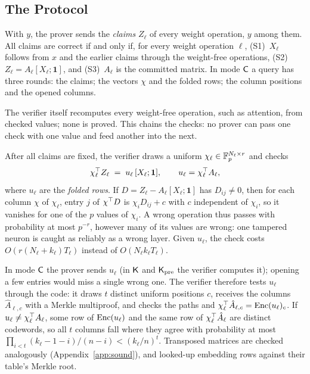 \subsection{The Protocol}
\label{sec:protocol}

With $y$, the prover sends the \emph{claims} $Z_\ell$ of every weight operation, $y$ among them. All
claims are correct if and only if, for every weight operation $\ell$, (S1)~$X_\ell$ follows from $x$
and the earlier claims through the weight-free operations,
(S2)~$Z_\ell=A_\ell[X_\ell;\mathbf 1]$, and (S3)~$A_\ell$ is the committed matrix. In mode $\mathsf{C}$ a
query has three rounds: the claims; the vectors $\chi$ and the folded rows; the column positions and
the opened columns.

 The verifier itself recomputes every weight-free operation, such as
attention, from checked values; none is proved. This chains the checks: no prover can pass one
check with one value and feed another into the next.

 After all claims are fixed, the verifier draws a uniform
$\chi_\ell\in\mathbb{F}_p^{N_\ell\times r}$ and checks
\begin{equation}
  \chi_\ell^\top Z_\ell \;=\; u_\ell\,[X_\ell;\mathbf 1], \qquad u_\ell=\chi_\ell^\top A_\ell,
  \label{eq:freivalds}
\end{equation}
where $u_\ell$ are the \emph{folded rows}. If $D=Z_\ell-A_\ell[X_\ell;\mathbf 1]$ has
$D_{ij}\neq0$, then for each column $\chi$ of $\chi_\ell$, entry $j$ of $\chi^\top D$ is
$\chi_iD_{ij}+c$ with $c$ independent of $\chi_i$, so it vanishes for one of the $p$ values of
$\chi_i$. A wrong operation thus passes with probability at most $p^{-r}$, however many of its
values are wrong: one tampered neuron is caught as reliably as a wrong layer. Given $u_\ell$, the
check costs $O(r(N_\ell+k_\ell)T_\ell)$ instead of $O(N_\ell k_\ell T_\ell)$.

 In mode $\mathsf{C}$ the prover sends $u_\ell$ (in $\mathsf{K}$ and $\mathsf{K}_{\mathrm{pre}}$ the
verifier computes it); opening a few entries would miss a single wrong one. The verifier therefore
tests $u_\ell$ through the code: it draws $t$ distinct uniform positions $c$, receives the columns
$\hat A_{\ell,c}$ with a Merkle multiproof, and checks the paths and
$\chi_\ell^\top\hat A_{\ell,c}=\mathrm{Enc}(u_\ell)_c$. If $u_\ell\neq\chi_\ell^\top A_\ell$, some row of
$\mathrm{Enc}(u_\ell)$ and the same row of $\chi_\ell^\top\hat A_\ell$ are distinct codewords, so all $t$
columns fall where they agree with probability at most $\prod_{i<t}(k_\ell-1-i)/(n-i)<(k_\ell/n)^t$.
Transposed matrices are checked analogously (Appendix~\ref{app:sound}), and looked-up embedding
rows against their table's Merkle root.

